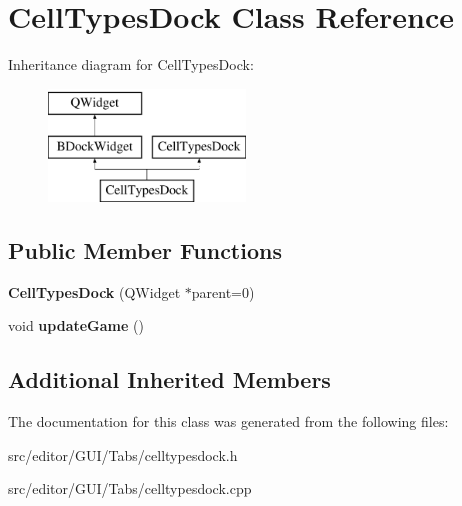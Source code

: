 \hypertarget{class_cell_types_dock}{}\section{Cell\+Types\+Dock Class Reference}
\label{class_cell_types_dock}
Inheritance diagram for Cell\+Types\+Dock\+:\begin{figure}[H]
\begin{center}
\leavevmode
\includegraphics[height=3.000000cm]{class_cell_types_dock}
\end{center}
\end{figure}
\subsection*{Public Member Functions}
\begin{DoxyCompactItemize}
\item 
\hypertarget{class_cell_types_dock_a0e1bc992465cea9c1fc71866b425fcbb}{}\label{class_cell_types_dock_a0e1bc992465cea9c1fc71866b425fcbb} 
{\bfseries Cell\+Types\+Dock} (Q\+Widget $\ast$parent=0)
\item 
\hypertarget{class_cell_types_dock_a700565cc4bb4c3e87d219d4d4726e680}{}\label{class_cell_types_dock_a700565cc4bb4c3e87d219d4d4726e680} 
void {\bfseries update\+Game} ()
\end{DoxyCompactItemize}
\subsection*{Additional Inherited Members}


The documentation for this class was generated from the following files\+:\begin{DoxyCompactItemize}
\item 
src/editor/\+G\+U\+I/\+Tabs/celltypesdock.\+h\item 
src/editor/\+G\+U\+I/\+Tabs/celltypesdock.\+cpp\end{DoxyCompactItemize}
